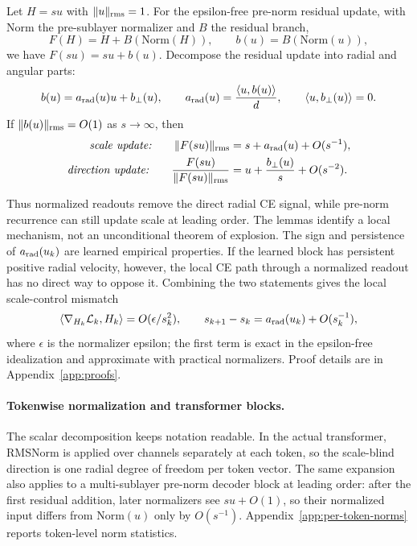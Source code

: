 \begin{lemma}
\label{lemma:expansion}
Let $H=su$ with $\|u\|_{\mathrm{rms}}=1$.
For the epsilon-free pre-norm residual update, with $\mathrm{Norm}$ the pre-sublayer normalizer and $B$ the residual branch,
\[
    F(H)=H+B(\mathrm{Norm}(H)),
    \qquad
    b(u)=B(\mathrm{Norm}(u)),
\]
we have $F(su)=su+b(u)$.
Decompose the residual update into radial and angular parts:
\[
    b(u)=a_{\mathrm{rad}}(u)u+b_\perp(u),
    \qquad
    a_{\mathrm{rad}}(u)=\frac{\langle u,b(u)\rangle}{d},
    \qquad
    \langle u,b_\perp(u)\rangle=0.
\]
If $\|b(u)\|_{\mathrm{rms}}=O(1)$ as $s\to\infty$, then
\begin{align*}
    \text{\emph{scale update:}}\qquad
    \|F(su)\|_{\mathrm{rms}}
    &= s+a_{\mathrm{rad}}(u)+O(s^{-1}), \\
    \text{\emph{direction update:}}\qquad
    \frac{F(su)}{\|F(su)\|_{\mathrm{rms}}}
    &= u+\frac{b_\perp(u)}{s}+O(s^{-2}).
\end{align*}
\end{lemma}
\noindent
Thus normalized readouts remove the direct radial CE signal, while pre-norm recurrence can still update scale at leading order.
The lemmas identify a local mechanism, not an unconditional theorem of explosion.
The sign and persistence of $a_{\mathrm{rad}}(u_k)$ are learned empirical properties.
If the learned block has persistent positive radial velocity, however, the local CE path through a normalized readout has no direct way to oppose it.
Combining the two statements gives the local scale-control mismatch
\begin{equation}
    \langle \nabla_{H_k}\mathcal{L}_k,H_k\rangle=O(\epsilon/s_k^2),
    \qquad
    s_{k+1}-s_k=a_{\mathrm{rad}}(u_k)+O(s_k^{-1}),
\end{equation}
where $\epsilon$ is the normalizer epsilon; the first term is exact in the epsilon-free idealization and approximate with practical normalizers.
Proof details are in Appendix~\ref{app:proofs}.

\paragraph{Tokenwise normalization and transformer blocks.}
The scalar decomposition keeps notation readable.
In the actual transformer, RMSNorm is applied over channels separately at each token, so the scale-blind direction is one radial degree of freedom per token vector.
The same expansion also applies to a multi-sublayer pre-norm decoder block at leading order: after the first residual addition, later normalizers see $su+O(1)$, so their normalized input differs from $\mathrm{Norm}(u)$ only by $O(s^{-1})$.
Appendix~\ref{app:per-token-norms} reports token-level norm statistics.

